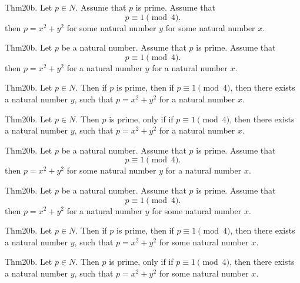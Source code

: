 \documentclass{article}
\begin{document}
Thm20b. Let $p \in N$. Assume that $p$ is prime. Assume that $$p \equiv 1 \pmod{ 4}.$$ then $p = x ^{ 2}+ y ^{ 2}$ for some natural number $y$ for some natural number $x$.

Thm20b. Let $p$ be a natural number. Assume that $p$ is prime. Assume that $$p \equiv 1 \pmod{ 4}.$$ then $p = x ^{ 2}+ y ^{ 2}$ for a natural number $y$ for a natural number $x$.

Thm20b. Let $p \in N$. Then if $p$ is prime, then if $p \equiv 1 \pmod{ 4}$, then there exists a natural number $y$, such that $p = x ^{ 2}+ y ^{ 2}$ for a natural number $x$.

Thm20b. Let $p \in N$. Then $p$ is prime, only if if $p \equiv 1 \pmod{ 4}$, then there exists a natural number $y$, such that $p = x ^{ 2}+ y ^{ 2}$ for a natural number $x$.

Thm20b. Let $p$ be a natural number. Assume that $p$ is prime. Assume that $$p \equiv 1 \pmod{ 4}.$$ then $p = x ^{ 2}+ y ^{ 2}$ for some natural number $y$ for a natural number $x$.

Thm20b. Let $p$ be a natural number. Assume that $p$ is prime. Assume that $$p \equiv 1 \pmod{ 4}.$$ then $p = x ^{ 2}+ y ^{ 2}$ for a natural number $y$ for some natural number $x$.

Thm20b. Let $p \in N$. Then if $p$ is prime, then if $p \equiv 1 \pmod{ 4}$, then there exists a natural number $y$, such that $p = x ^{ 2}+ y ^{ 2}$ for some natural number $x$.

Thm20b. Let $p \in N$. Then $p$ is prime, only if if $p \equiv 1 \pmod{ 4}$, then there exists a natural number $y$, such that $p = x ^{ 2}+ y ^{ 2}$ for some natural number $x$.
\end{document}
